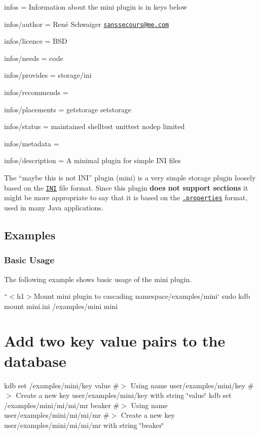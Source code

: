 
\begin{DoxyItemize}
\item infos = Information about the mini plugin is in keys below
\item infos/author = René Schwaiger \href{mailto:sanssecours@me.com}{\tt sanssecours@me.\+com}
\item infos/licence = B\+SD
\item infos/needs = code
\item infos/provides = storage/ini
\item infos/recommends =
\item infos/placements = getstorage setstorage
\item infos/status = maintained shelltest unittest nodep limited
\item infos/metadata =
\item infos/description = A minimal plugin for simple I\+NI files
\end{DoxyItemize}

The “maybe this is not I\+N\+I” plugin ({\ttfamily mini}) is a very simple storage plugin loosely based on the \href{https://en.wikipedia.org/wiki/INI_file}{\tt I\+NI} file format. Since this plugin {\bfseries does not support sections} it might be more appropriate to say that it is based on the \href{https://en.wikipedia.org/wiki/.properties}{\tt .properties} format, used in many Java applications.

\subsection*{Examples}

\subsubsection*{Basic Usage}

The following example shows basic usage of the {\ttfamily mini} plugin.

``{\ttfamily  $<$h1$>$Mount mini plugin to cascading namespace}/examples/mini` sudo kdb mount mini.\+ini /examples/mini mini

\section*{Add two key value pairs to the database}

kdb set /examples/mini/key value \#$>$ Using name user/examples/mini/key \#$>$ Create a new key user/examples/mini/key with string \char`\"{}value\char`\"{} kdb set /examples/mini/mi/mi/mr beaker \#$>$ Using name user/examples/mini/mi/mi/mr \#$>$ Create a new key user/examples/mini/mi/mi/mr with string \char`\"{}beaker\char`\"{}

